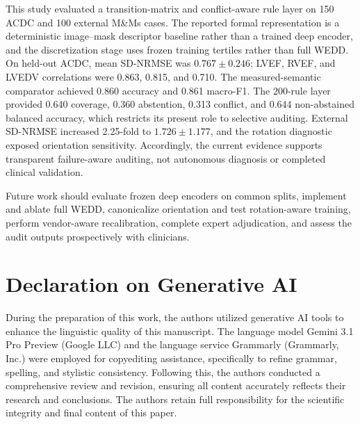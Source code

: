 \documentclass{ceurart}
\begin{document}
This study evaluated a transition-matrix and conflict-aware rule layer on 150 ACDC and 100 external M\&Ms cases. The reported formal representation is a deterministic image--mask descriptor baseline rather than a trained deep encoder, and the discretization stage uses frozen training tertiles rather than full WEDD. On held-out ACDC, mean SD-NRMSE was \(0.767\pm0.246\); LVEF, RVEF, and LVEDV correlations were 0.863, 0.815, and 0.710. The measured-semantic comparator achieved 0.860 accuracy and 0.861 macro-F1. The 200-rule layer provided 0.640 coverage, 0.360 abstention, 0.313 conflict, and 0.644 non-abstained balanced accuracy, which restricts its present role to selective auditing. External SD-NRMSE increased 2.25-fold to \(1.726\pm1.177\), and the rotation diagnostic exposed orientation sensitivity. Accordingly, the current evidence supports transparent failure-aware auditing, not autonomous diagnosis or completed clinical validation.

Future work should evaluate frozen deep encoders on common splits, implement and ablate full WEDD, canonicalize orientation and test rotation-aware training, perform vendor-aware recalibration, complete expert adjudication, and assess the audit outputs prospectively with clinicians.

\section*{Declaration on Generative AI}
During the preparation of this work, the authors utilized generative AI tools to enhance the linguistic quality of this manuscript. The language model Gemini 3.1 Pro Preview (Google LLC) and the language service Grammarly (Grammarly, Inc.) were employed for copyediting assistance, specifically to refine grammar, spelling, and stylistic consistency. Following this, the authors conducted a comprehensive review and revision, ensuring all content accurately reflects their research and conclusions. The authors retain full responsibility for the scientific integrity and final content of this paper.


\end{document}
